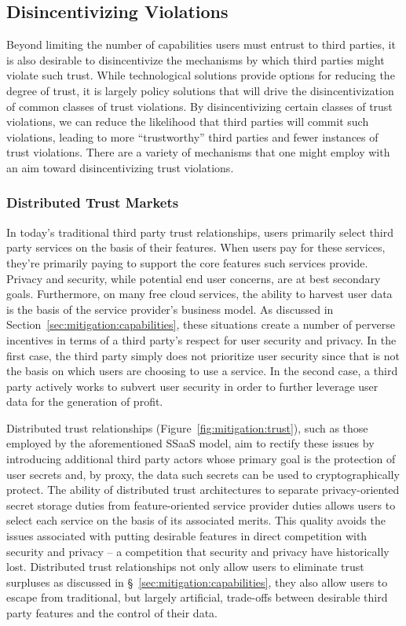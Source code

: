 \subsection{Disincentivizing Violations}
\label{sec:mitigation:violations}

Beyond limiting the number of capabilities users must entrust to third
parties, it is also desirable to disincentivize the mechanisms by
which third parties might violate such trust.  While technological
solutions provide options for reducing the degree of trust, it is
largely policy solutions that will drive the disincentivization of
common classes of trust violations. By disincentivizing certain
classes of trust violations, we can reduce the likelihood that third
parties will commit such violations, leading to more ``trustworthy''
third parties and fewer instances of trust violations. There are a
variety of mechanisms that one might employ with an aim toward
disincentivizing trust violations.

\subsubsection{Distributed Trust Markets}

In today's traditional third party trust relationships, users
primarily select third party services on the basis of their
features. When users pay for these services, they're primarily paying
to support the core features such services provide. Privacy and
security, while potential end user concerns, are at best secondary
goals. Furthermore, on many free cloud services, the ability to
harvest user data is the basis of the service provider's business
model. As discussed in Section~\ref{sec:mitigation:capabilities},
these situations create a number of perverse incentives in terms of a
third party's respect for user security and privacy. In the first
case, the third party simply does not prioritize user security since
that is not the basis on which users are choosing to use a service. In
the second case, a third party actively works to subvert user security
in order to further leverage user data for the generation of profit.

Distributed trust relationships (Figure~\ref{fig:mitigation:trust}),
such as those employed by the aforementioned SSaaS model, aim to
rectify these issues by introducing additional third party actors
whose primary goal is the protection of user secrets and, by proxy,
the data such secrets can be used to cryptographically protect. The
ability of distributed trust architectures to separate
privacy-oriented secret storage duties from feature-oriented service
provider duties allows users to select each service on the basis of
its associated merits. This quality avoids the issues associated with
putting desirable features in direct competition with security and
privacy -- a competition that security and privacy have historically
lost. Distributed trust relationships not only allow users to
eliminate trust surpluses as discussed in
\S~\ref{sec:mitigation:capabilities}, they also allow users to escape
from traditional, but largely artificial, trade-offs between desirable
third party features and the control of their data.

